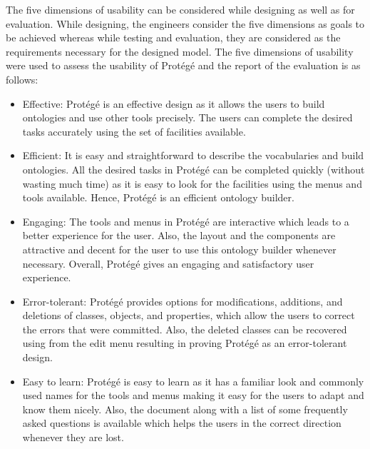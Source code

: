 \begin{doublespace}
\begin{itemize}
\end{itemize}
\par The five dimensions of usability can be considered while designing as well as for evaluation. While designing, the engineers consider the five dimensions as goals to be achieved whereas while testing and evaluation, they are considered as the requirements necessary for the designed model. The five dimensions of usability were used to assess the usability of Protégé and the report of the evaluation is as follows:
\begin{itemize}
  \item Effective: Protégé is an effective design as it allows the users to build ontologies and use other tools precisely. The users can complete the desired tasks accurately using the set of facilities available.
  \item Efficient: It is easy and straightforward to describe the vocabularies and build ontologies. All the desired tasks in Protégé can be completed quickly (without wasting much time) as it is easy to look for the facilities using the menus and tools available. Hence, Protégé is an efficient ontology builder.
  \item Engaging: The tools and menus in Protégé are interactive which leads to a better experience for the user. Also, the layout and the components are attractive and decent for the user to use this ontology builder whenever necessary. Overall, Protégé gives an engaging and satisfactory user experience.
  \item Error-tolerant: Protégé provides options for modifications, additions, and deletions of classes, objects, and properties, which allow the users to correct the errors that were committed. Also, the deleted classes can be recovered using  from the edit menu resulting in proving Protégé as an error-tolerant design.
  \item Easy to learn: Protégé is easy to learn as it has a familiar look and commonly used names for the tools and menus making it easy for the users to adapt and know them nicely. Also, the  document along with a list of some frequently asked questions is available which helps the users in the correct direction whenever they are lost.
\end{itemize}

\end{doublespace}
